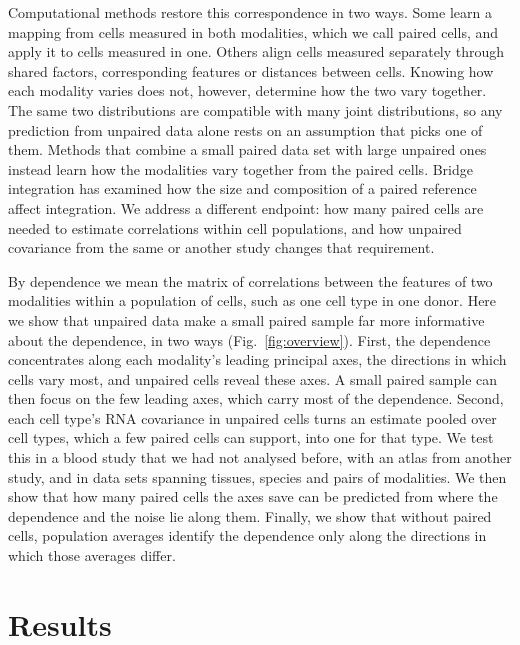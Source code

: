 \documentclass[pdflatex,sn-vancouver-num,iicol]{sn-jnl}
\begin{document}
Computational methods restore this correspondence in two ways. Some learn a mapping from cells measured in both modalities, which we call paired cells, and apply it to cells measured in one\cite{stuart2019,zhou2020,totalvi2021,lotfollahi2022,hao2024}. Others align cells measured separately through shared factors, corresponding features or distances between cells\cite{welch2019,cao2022,demetci2022}. Knowing how each modality varies does not, however, determine how the two vary together. The same two distributions are compatible with many joint distributions\cite{dorazio2006,manski2003}, so any prediction from unpaired data alone rests on an assumption that picks one of them\cite{argelaguet2021}. Methods that combine a small paired data set with large unpaired ones instead learn how the modalities vary together from the paired cells\cite{hao2024,kimura2013,champollion}. Bridge integration has examined how the size and composition of a paired reference affect integration\cite{hao2024}. We address a different endpoint: how many paired cells are needed to estimate correlations within cell populations, and how unpaired covariance from the same or another study changes that requirement.

By dependence we mean the matrix of correlations between the features of two modalities within a population of cells, such as one cell type in one donor. Here we show that unpaired data make a small paired sample far more informative about the dependence, in two ways (Fig.~\ref{fig:overview}). First, the dependence concentrates along each modality's leading principal axes, the directions in which cells vary most, and unpaired cells reveal these axes. A small paired sample can then focus on the few leading axes, which carry most of the dependence. Second, each cell type's RNA covariance in unpaired cells turns an estimate pooled over cell types, which a few paired cells can support, into one for that type. We test this in a blood study that we had not analysed before, with an atlas from another study, and in data sets spanning tissues, species and pairs of modalities. We then show that how many paired cells the axes save can be predicted from where the dependence and the noise lie along them. Finally, we show that without paired cells, population averages identify the dependence only along the directions in which those averages differ.

\section{Results}
\end{document}
